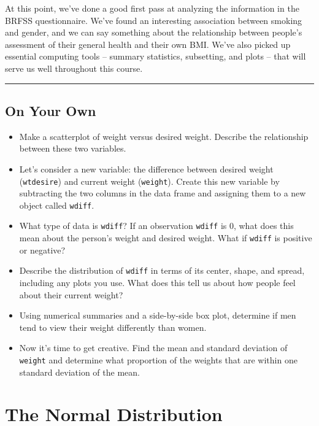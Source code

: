 \documentclass[]{book}
\theoremstyle{definition}
\theoremstyle{definition}
\theoremstyle{definition}
\theoremstyle{remark}
\begin{document}
At this point, we've done a good first pass at analyzing the information
in the BRFSS questionnaire. We've found an interesting association
between smoking and gender, and we can say something about the
relationship between people's assessment of their general health and
their own BMI. We've also picked up essential computing tools -- summary
statistics, subsetting, and plots -- that will serve us well throughout
this course.

\begin{center}\rule{0.5\linewidth}{\linethickness}\end{center}

\hypertarget{on-your-own-1}{%
\section{On Your Own}\label{on-your-own-1}}

\begin{itemize}
\item
  Make a scatterplot of weight versus desired weight. Describe the
  relationship between these two variables.
\item
  Let's consider a new variable: the difference between desired weight
  (\texttt{wtdesire}) and current weight (\texttt{weight}). Create this
  new variable by subtracting the two columns in the data frame and
  assigning them to a new object called \texttt{wdiff}.
\item
  What type of data is \texttt{wdiff}? If an observation \texttt{wdiff}
  is 0, what does this mean about the person's weight and desired
  weight. What if \texttt{wdiff} is positive or negative?
\item
  Describe the distribution of \texttt{wdiff} in terms of its center,
  shape, and spread, including any plots you use. What does this tell us
  about how people feel about their current weight?
\item
  Using numerical summaries and a side-by-side box plot, determine if
  men tend to view their weight differently than women.
\item
  Now it's time to get creative. Find the mean and standard deviation of
  \texttt{weight} and determine what proportion of the weights that are
  within one standard deviation of the mean.
\end{itemize}

\hypertarget{the-normal-distribution}{%
\chapter{The Normal Distribution}\label{the-normal-distribution}}
\end{document}
